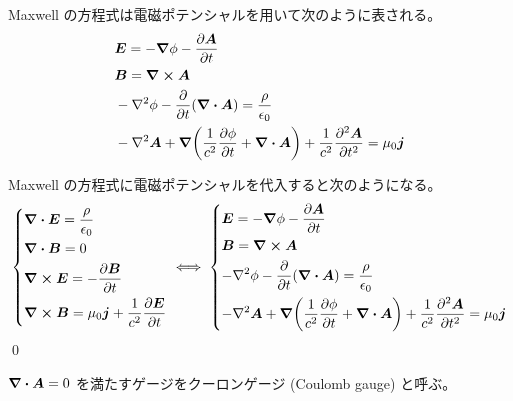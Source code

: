 \documentclass[uplatex,dvipdfmx,a4paper,11pt]{jlreq}
\makeatletter
\newcommand{\EE}{\bm{E}}
\newcommand{\BB}{\bm{B}}
\renewcommand{\AA}{\bm{A}}
\theoremstyle{definition}
\renewenvironment{proof}[1][\proofname]{\par
  \normalfont
  \topsep6\p@\@plus6\p@ \trivlist
  \item[\hskip\labelsep{\bfseries #1}\@addpunct{\bfseries}]\ignorespaces\quad\par
}{%
  \qed\endtrivlist\@endpefalse
}
\renewcommand\proofname{証明}
\makeatother
\begin{document}
\begin{theorem}
  Maxwell の方程式は電磁ポテンシャルを用いて次のように表される。
  \begin{align}
     & \EE = - \vnabla\phi - \pdv{\AA}{t}                                                                                      \\
     & \BB = \vnabla\cross\AA                                                                                                  \\
     & -\laplacian\phi - \pdv{t}(\vnabla\vdot\AA) = \frac{\rho}{\epsilon_0}                                                    \\
     & -\laplacian\AA + \vnabla\qty(\frac{1}{c^2}\pdv{\phi}{t} + \vnabla\vdot\AA) + \frac{1}{c^2}\pdv[2]{\AA}{t} = \mu_0\bm{j}
  \end{align}
\end{theorem}
\begin{proof}
  Maxwell の方程式に電磁ポテンシャルを代入すると次のようになる。
  \begin{align}
    \begin{dcases}
      \vnabla\vdot\EE  = \frac{\rho}{\epsilon_0} \\
      \vnabla\vdot\BB  = 0                       \\
      \vnabla\cross\EE = -\pdv{\BB}{t}           \\
      \vnabla\cross\BB = \mu_0\bm{j} + \frac{1}{c^2}\pdv{\EE}{t}
    \end{dcases}
    \iff
    \begin{dcases}
      \EE = - \vnabla\phi - \pdv{\AA}{t}                                   \\
      \BB = \vnabla\cross\AA                                               \\
      -\laplacian\phi - \pdv{t}(\vnabla\vdot\AA) = \frac{\rho}{\epsilon_0} \\
      -\laplacian\AA + \vnabla\qty(\frac{1}{c^2}\pdv{\phi}{t} + \vnabla\vdot\AA) + \frac{1}{c^2}\pdv[2]{\AA}{t} = \mu_0\bm{j}
    \end{dcases}
  \end{align}
\end{proof}

\begin{definition}
  $\vnabla\vdot\AA = 0$ を満たすゲージをクーロンゲージ (Coulomb gauge) と呼ぶ。
\end{definition}
\end{document}
